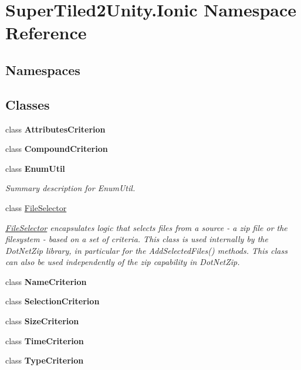 \hypertarget{namespace_super_tiled2_unity_1_1_ionic}{}\section{Super\+Tiled2\+Unity.\+Ionic Namespace Reference}
\label{namespace_super_tiled2_unity_1_1_ionic}
\subsection*{Namespaces}
\begin{DoxyCompactItemize}
\end{DoxyCompactItemize}
\subsection*{Classes}
\begin{DoxyCompactItemize}
\item 
class {\bfseries Attributes\+Criterion}
\item 
class {\bfseries Compound\+Criterion}
\item 
class {\bfseries Enum\+Util}
\begin{DoxyCompactList}\small\item\em Summary description for Enum\+Util. \end{DoxyCompactList}\item 
class \mbox{\hyperlink{class_super_tiled2_unity_1_1_ionic_1_1_file_selector}{File\+Selector}}
\begin{DoxyCompactList}\small\item\em \mbox{\hyperlink{class_super_tiled2_unity_1_1_ionic_1_1_file_selector}{File\+Selector}} encapsulates logic that selects files from a source -\/ a zip file or the filesystem -\/ based on a set of criteria. This class is used internally by the Dot\+Net\+Zip library, in particular for the Add\+Selected\+Files() methods. This class can also be used independently of the zip capability in Dot\+Net\+Zip. \end{DoxyCompactList}\item 
class {\bfseries Name\+Criterion}
\item 
class {\bfseries Selection\+Criterion}
\item 
class {\bfseries Size\+Criterion}
\item 
class {\bfseries Time\+Criterion}
\item 
class {\bfseries Type\+Criterion}
\end{DoxyCompactItemize}
